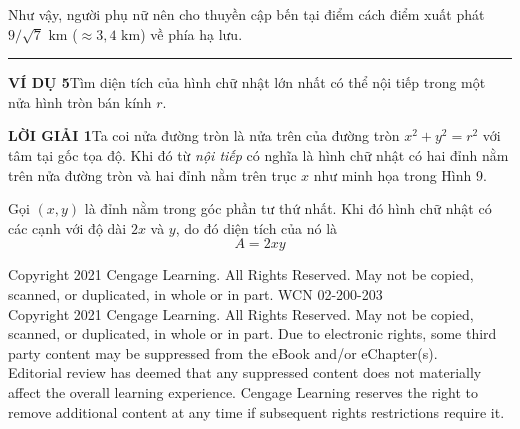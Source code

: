 \documentclass[10pt]{article}
\begin{document}
\begin{minipage}[t]{121mm}
Như vậy, người phụ nữ nên cho thuyền cập bến tại điểm cách điểm xuất phát $9/\sqrt{7}\text{ km}$ ($\approx 3{,}4\text{ km}$) về phía hạ lưu.\hfill{\color{stewartblue}\rule{1.2ex}{1.2ex}}
\par\vspace{12pt}
{\bfseries\color{stewartblue}VÍ DỤ 5}\quad Tìm diện tích của hình chữ nhật lớn nhất có thể nội tiếp trong một nửa hình tròn bán kính $r$.
\par\vspace{7pt}
{\bfseries\color{stewartblue}LỜI GIẢI 1}\quad Ta coi nửa đường tròn là nửa trên của đường tròn $x^2 + y^2 = r^2$ với tâm tại gốc tọa độ. Khi đó từ \textit{nội tiếp} có nghĩa là hình chữ nhật có hai đỉnh nằm trên nửa đường tròn và hai đỉnh nằm trên trục $x$ như minh họa trong Hình 9.
\par\vspace{4pt}
Gọi $(x, y)$ là đỉnh nằm trong góc phần tư thứ nhất. Khi đó hình chữ nhật có các cạnh với độ dài $2x$ và $y$, do đó diện tích của nó là
\[
A = 2xy
\]
\end{minipage}

\vfill
\begin{center}
{\fontsize{5.5}{6.5}\selectfont\color{gray}
Copyright 2021 Cengage Learning. All Rights Reserved. May not be copied, scanned, or duplicated, in whole or in part. WCN 02-200-203\\[1pt]
Copyright 2021 Cengage Learning. All Rights Reserved. May not be copied, scanned, or duplicated, in whole or in part. Due to electronic rights, some third party content may be suppressed from the eBook and/or eChapter(s).\\
Editorial review has deemed that any suppressed content does not materially affect the overall learning experience. Cengage Learning reserves the right to remove additional content at any time if subsequent rights restrictions require it.
}
\end{center}
\end{document}
